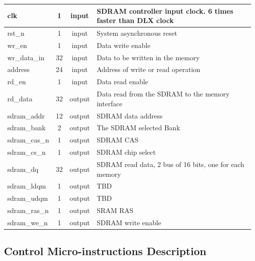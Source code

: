 \documentclass{article}
\begin{document}
\begin{center}
\begin{longtable}[pos]{| l | c | c | m{7cm} |}
        clk               & 1   & input  & SDRAM controller input clock. 6 times faster than DLX clock    \\ \hline
        rst\_n               & 1   & input  & System asynchronous reset    \\ \hline
        wr\_en           & 1  & input  & Data write enable \\ \hline
        wr\_data\_in           & 32  & input  & Data to be written in the memory \\ \hline
        address      & 24   & input  & Address of write or read operation \\ \hline
        rd\_en        & 1   & input  & Data read enable  \\ \hline
        rd\_data  & 32 & output  & Data read from the SDRAM to the memory interface \\ \hline
        sdram\_addr          & 12 & output  & SDRAM data address \\ \hline
        sdram\_bank        & 2   & output & The SDRAM selected Bank  \\ \hline
        sdram\_cas\_n           & 1  & output & SDRAM CAS  \\ \hline
        sdram\_cs\_n    & 1  & output  & SDRAM chip select  \\ \hline
        sdram\_dq    & 32  & output  & SDRAM read data, 2 bus of 16 bits, one for each memory  \\ \hline
        sdram\_ldqm    & 1  & output  & TBD  \\ \hline
        sdram\_udqm    & 1  & output  & TBD  \\ \hline
        sdram\_ras\_n    & 1  & output  & SRAM RAS  \\ \hline
        sdram\_we\_n    & 1  & output  & SDRAM write enable  \\ \hline
      \end{longtable}
    \end{center} 


\newpage  
  \subsection{Control Micro-instructions Description}
\end{document}
